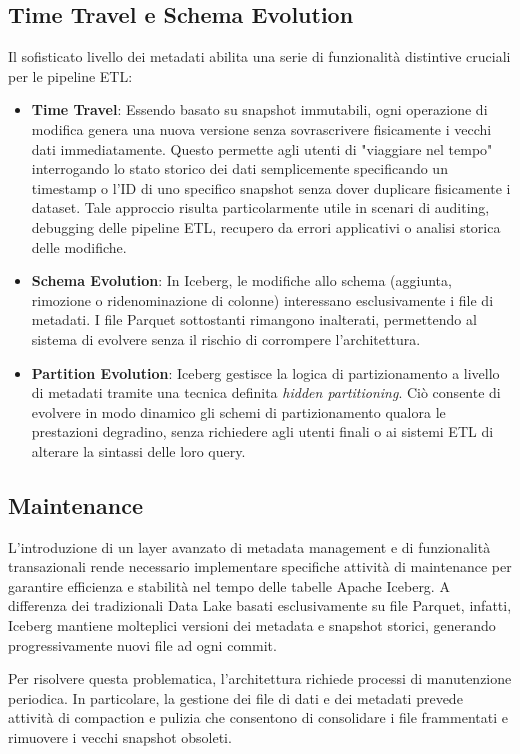 \documentclass[12pt,a4paper,openright,twoside]{book}
\begin{document}
\subsection{Time Travel e Schema Evolution}
Il sofisticato livello dei metadati abilita una serie di funzionalità distintive cruciali per le pipeline ETL:
\begin{itemize}
    \item \textbf{Time Travel}: Essendo basato su snapshot immutabili, ogni operazione di modifica genera una nuova versione senza sovrascrivere fisicamente i vecchi dati immediatamente. 
    Questo permette agli utenti di "viaggiare nel tempo" interrogando lo stato storico dei dati semplicemente specificando un timestamp o l'ID di uno specifico snapshot senza dover duplicare fisicamente i dataset. 
    Tale approccio risulta particolarmente utile in scenari di auditing, debugging delle pipeline ETL, recupero da errori applicativi o analisi storica delle modifiche.
    \item \textbf{Schema Evolution}: In Iceberg, le modifiche allo schema (aggiunta, rimozione o ridenominazione di colonne) interessano esclusivamente i file di metadati. 
    I file Parquet sottostanti rimangono inalterati, permettendo al sistema di evolvere senza il rischio di corrompere l'architettura.  
    \item \textbf{Partition Evolution}: Iceberg gestisce la logica di partizionamento a livello di metadati tramite una tecnica definita \textit{hidden partitioning}. 
    Ciò consente di evolvere in modo dinamico gli schemi di partizionamento qualora le prestazioni degradino, senza richiedere agli utenti finali o ai sistemi ETL di alterare la sintassi delle loro query. 
\end{itemize}

\subsection{Maintenance}
L’introduzione di un layer avanzato di metadata management e di funzionalità transazionali rende necessario implementare specifiche attività di maintenance per garantire efficienza e stabilità nel tempo delle tabelle Apache Iceberg. 
A differenza dei tradizionali Data Lake basati esclusivamente su file Parquet, infatti, Iceberg mantiene molteplici versioni dei metadata e snapshot storici, generando progressivamente nuovi file ad ogni commit.

Per risolvere questa problematica, l'architettura richiede processi di manutenzione periodica. In particolare, la gestione dei file di dati e dei metadati prevede attività di compaction e pulizia che consentono di consolidare i file frammentati e rimuovere i vecchi snapshot obsoleti.
\end{document}
